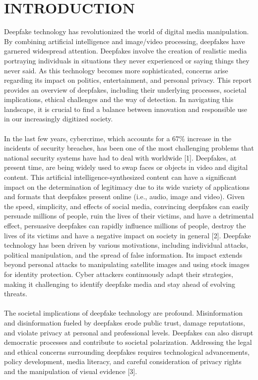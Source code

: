 

\section{INTRODUCTION}
Deepfake technology has revolutionized the world of digital media manipulation. By combining artificial intelligence and image/video processing, deepfakes have garnered widespread attention. Deepfakes involve the creation of realistic media portraying individuals in situations they never experienced or saying things they never said. As this technology becomes more sophisticated, concerns arise regarding its impact on politics, entertainment, and personal privacy. This report provides an overview of deepfakes, including their underlying processes, societal implications, ethical challenges and the way of detection. In navigating this landscape, it is crucial to find a balance between innovation and responsible use in our increasingly digitized society.
\\
\\
In the last few years, cybercrime, which accounts for a 67\% increase in the incidents of security breaches, has been one of the most challenging problems that national security systems have had to deal with worldwide [1].
Deepfakes, at present time, are being widely used to swap faces or objects in video and digital content. This artificial intelligence-synthesized
content can have a significant impact on the determination of legitimacy due to its wide variety of applications and formats that deepfakes present online (i.e., audio, image and video).
Given the speed, simplicity, and effects of social media, convincing deepfakes can easily persuade millions of people, ruin the lives of their victims, and have a detrimental effect, persuasive deepfakes can rapidly influence millions of people, destroy the lives of its victims and have a negative impact on society in general [2].
Deepfake technology has been driven by various motivations, including individual attacks, political manipulation, and the spread of false information. Its impact extends beyond personal attacks to manipulating satellite images and using stock images for identity protection. Cyber attackers continuously adapt their strategies, making it challenging to identify deepfake media and stay ahead of evolving threats.
\\\\
The societal implications of deepfake technology are profound. Misinformation and disinformation fueled by deepfakes erode public trust, damage reputations, and violate privacy at personal and professional levels. Deepfakes can also disrupt democratic processes and contribute to societal polarization. Addressing the legal and ethical concerns surrounding deepfakes requires technological advancements, policy development, media literacy, and careful consideration of privacy rights and the manipulation of visual evidence [3].
